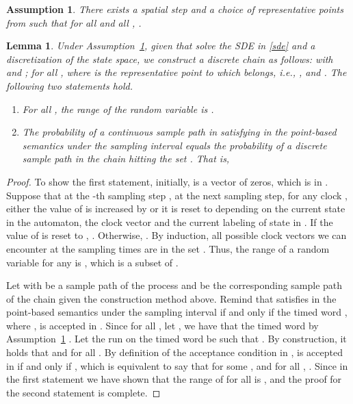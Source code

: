 \documentclass[letterpaper, 10 pt, conference]{ieeeconf}
\newtheorem{assumption}{Assumption}
\newtheorem{lemma}{Lemma}
\begin{document}
\begin{assumption}
\label{assume:equivalent}
There exists a spatial step  and a choice of
representative points from  such that for all  and all
, . 
\end{assumption}
\begin{lemma}
  \label{lma1}Under Assumption~\ref{assume:equivalent}, given
   that solve the SDE in \eqref{sde} and a
  discretization  of the state space, we construct a discrete
  chain  as follows:
   with  and
  ; for all
  ,  where  is the
  representative point to which  belongs, i.e.,
  , and
  .
  The following two statements hold.
\begin{enumerate}
\item For all , the range of the random variable  is
  .
\item The probability of a continuous sample path in
   satisfying  in the point-based semantics
  under the sampling interval  equals the probability of a
  discrete sample path in the chain  hitting the
  set . That is,

\end{enumerate}
\end{lemma}

\begin{proof}
  To show the first
  statement, initially,  is a vector of zeros, which is in
  . Suppose that at the -th sampling step
  , at the next sampling step, for any clock
  , either the value of  is increased by  or
  it is reset to  depending on the current state in the automaton,
  the clock vector and the current labeling of state in .  If the
  value of  is reset to ,
  . Otherwise,
  .  By
  induction, all possible clock vectors we can encounter at the
  sampling times are in the set . Thus, the range of a
  random variable  for any  is , which is a
  subset of .


  Let  with  be a sample path of
  the process  and  be the
  corresponding sample path of the chain  given
  the construction method above. Remind that 
  satisfies  in the point-based semantics under the sampling
  interval  if and only if the timed word ,
  where , is accepted in .
  Since  for all , let
  , we have that the timed word
   by
  Assumption~\ref{assume:equivalent} . Let the run on the timed word
   be  such that
  .
  By construction, it holds that  and
   for all . By definition of the
  acceptance condition in ,
   is accepted in  if and
  only if , which is equivalent to say
  that for some ,  and
  for all , . Since in the
  first statement we have shown that the range of  for all
   is ,
   and the proof for the
  second statement is complete.
\end{proof}
\end{document}
